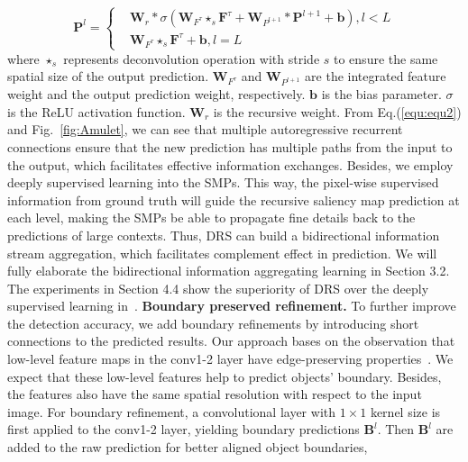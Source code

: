 \documentclass[10pt,twocolumn,letterpaper]{article}
\begin{document}
\begin{equation}
  \label{equ:equ2}
\textbf{P}^{l}=
\left\{
\begin{aligned}
&\textbf{W}_{r}*\sigma(\textbf{W}_{F^{\tau}}\star_{s}\textbf{F}^{\tau}+\textbf{W}_{P^{l+1}}*\textbf{P}^{l+1}+\textbf{b}),l<L\\
&\textbf{W}_{F^{\tau}}\star_{s}\textbf{F}^{\tau}+\textbf{b}, l = L
\end{aligned}
\right.
\end{equation}
where $\star_{s}$ represents deconvolution operation with stride $s$ to ensure the same spatial size of the output prediction.
%
$\textbf{W}_{F^{\tau}}$ and $\textbf{W}_{P^{l+1}}$ are the integrated feature weight and the output prediction weight, respectively.
%
$\textbf{b}$ is the bias parameter.
%
$\sigma$ is the ReLU activation function.
%
$\textbf{W}_{r}$ is the recursive weight.
%
From Eq.(\ref{equ:equ2}) and Fig.~\ref{fig:Amulet}, we can see that multiple autoregressive recurrent connections
ensure that the new prediction has multiple paths from the input to the output, which facilitates effective information exchanges.
%
Besides, we employ deeply supervised learning into the SMPs.
%
This way, the pixel-wise supervised information from ground truth will guide the recursive saliency map prediction at each level, making the SMPs be able to propagate fine details back to the predictions of large contexts.
%
Thus, DRS can build a bidirectional information stream aggregation, which facilitates complement effect in prediction.
%
We will fully elaborate the bidirectional information aggregating learning in Section 3.2.
%
The experiments in Section 4.4 show the superiority of DRS over the deeply supervised learning in~\cite{xie2015holistically}.
\vspace{-5mm}
{\flushleft\textbf{Boundary preserved refinement.}}
To further improve the detection accuracy, we add boundary refinements by introducing short connections to the predicted results.
%
Our approach bases on the observation that low-level feature maps in the conv1-2 layer have edge-preserving properties~\cite{zeiler2014visualizing,mahendran2015understanding}.
%
We expect that these low-level features help to predict objects' boundary.
%
Besides, the features also have the same spatial resolution with respect to the input image.
%
For boundary refinement, a convolutional layer with $1\times1$ kernel size is first applied to the conv1-2 layer, yielding
boundary predictions $\textbf{B}^{l}$.
%
Then $\textbf{B}^{l}$ are added to the raw prediction for better aligned object boundaries,
\end{document}
